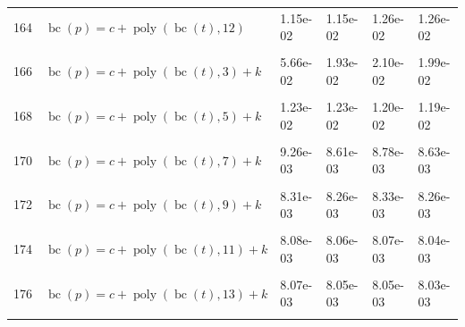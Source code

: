\documentclass[12pt,a4paper]{article}
\DeclareMathOperator{\bc}{bc}
\DeclareMathOperator{\poly}{poly}
\begin{document}
\begin{longtable}[t]{ll>{\raggedleft\arraybackslash}p{2cm}>{\raggedleft\arraybackslash}p{2cm}>{\raggedleft\arraybackslash}p{2cm}>{\raggedleft\arraybackslash}p{2cm}}
164 & $\bc(p) = c + \poly\left( \bc(t), 12 \right)$ & 1.15e-02 & 1.15e-02 & 1.26e-02 & 1.26e-02\\
\cellcolor{gray!6}{165} & \cellcolor{gray!6}{$\bc(p) = c + \poly\left( \bc(t), 13 \right)$} & \cellcolor{gray!6}{1.15e-02} & \cellcolor{gray!6}{1.15e-02} & \cellcolor{gray!6}{1.26e-02} & \cellcolor{gray!6}{1.26e-02}\\
166 & $\bc(p) = c + \poly\left( \bc(t), 3 \right) + k$ & 5.66e-02 & 1.93e-02 & 2.10e-02 & 1.99e-02\\
\cellcolor{gray!6}{167} & \cellcolor{gray!6}{$\bc(p) = c + \poly\left( \bc(t), 4 \right) + k$} & \cellcolor{gray!6}{2.42e-02} & \cellcolor{gray!6}{2.28e-02} & \cellcolor{gray!6}{2.52e-02} & \cellcolor{gray!6}{2.45e-02}\\
168 & $\bc(p) = c + \poly\left( \bc(t), 5 \right) + k$ & 1.23e-02 & 1.23e-02 & 1.20e-02 & 1.19e-02\\
\cellcolor{gray!6}{169} & \cellcolor{gray!6}{$\bc(p) = c + \poly\left( \bc(t), 6 \right) + k$} & \cellcolor{gray!6}{1.07e-02} & \cellcolor{gray!6}{9.82e-03} & \cellcolor{gray!6}{1.11e-02} & \cellcolor{gray!6}{1.00e-02}\\
170 & $\bc(p) = c + \poly\left( \bc(t), 7 \right) + k$ & 9.26e-03 & 8.61e-03 & 8.78e-03 & 8.63e-03\\
\cellcolor{gray!6}{171} & \cellcolor{gray!6}{$\bc(p) = c + \poly\left( \bc(t), 8 \right) + k$} & \cellcolor{gray!6}{8.24e-03} & \cellcolor{gray!6}{8.21e-03} & \cellcolor{gray!6}{8.24e-03} & \cellcolor{gray!6}{8.20e-03}\\
172 & $\bc(p) = c + \poly\left( \bc(t), 9 \right) + k$ & 8.31e-03 & 8.26e-03 & 8.33e-03 & 8.26e-03\\
\cellcolor{gray!6}{173} & \cellcolor{gray!6}{$\bc(p) = c + \poly\left( \bc(t), 10 \right) + k$} & \cellcolor{gray!6}{8.08e-03} & \cellcolor{gray!6}{8.06e-03} & \cellcolor{gray!6}{8.06e-03} & \cellcolor{gray!6}{8.04e-03}\\
174 & $\bc(p) = c + \poly\left( \bc(t), 11 \right) + k$ & 8.08e-03 & 8.06e-03 & 8.07e-03 & 8.04e-03\\
\cellcolor{gray!6}{175} & \cellcolor{gray!6}{$\bc(p) = c + \poly\left( \bc(t), 12 \right) + k$} & \cellcolor{gray!6}{8.07e-03} & \cellcolor{gray!6}{8.05e-03} & \cellcolor{gray!6}{8.05e-03} & \cellcolor{gray!6}{8.03e-03}\\
176 & $\bc(p) = c + \poly\left( \bc(t), 13 \right) + k$ & 8.07e-03 & 8.05e-03 & 8.05e-03 & 8.03e-03\\
\cellcolor{gray!6}{177} & \cellcolor{gray!6}{$\bc(p) = c + \poly\left( \bc(t), 3 \right) * k$} & \cellcolor{gray!6}{5.56e-02} & \cellcolor{gray!6}{1.77e-02} & \cellcolor{gray!6}{1.97e-02} & \cellcolor{gray!6}{1.85e-02}\\

\end{longtable}
\end{document}
